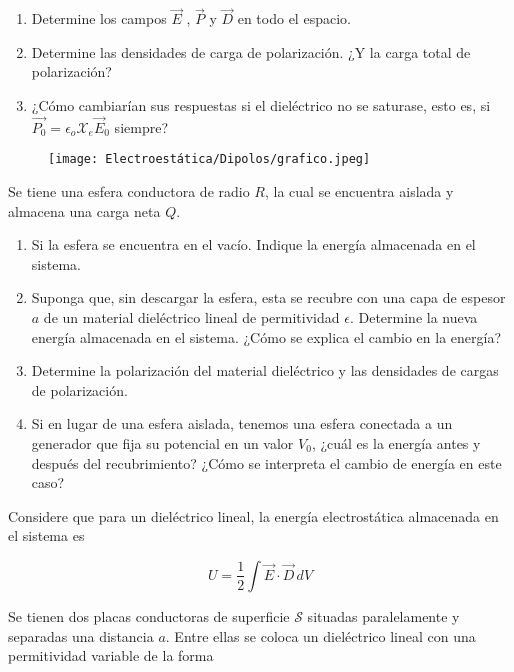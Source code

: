 \begin{enumerate}[label=\alph*)]
    \item Determine los campos $\Vec{E}$ , $\Vec{P}$ y $\Vec{D}$ en todo el espacio.
    \item Determine las densidades de carga de polarización. ¿Y la carga total de polarización?
    \item ¿Cómo cambiarían sus respuestas si el dieléctrico no se saturase, esto es, si $\Vec{P_0}=\epsilon_o\mathcal{X}_e\Vec{E}_0$ siempre?
\end{enumerate}

\begin{figure}[H]
    \centering
    \texttt{[image: Electroestática/Dipolos/grafico.jpeg]}
\end{figure}

\bigbreak
\np %

Se tiene una esfera conductora de radio $R$, la cual se encuentra aislada y almacena una carga neta $Q$.

\begin{enumerate}[label=\alph*)]
    \item Si la esfera se encuentra en el vacío. Indique la energía almacenada en el sistema. %
    \item  Suponga que, sin descargar la esfera, esta se recubre con una capa de espesor $a$ de un material dieléctrico lineal de permitividad $\epsilon$. Determine la nueva energía almacenada en el sistema. ¿Cómo se explica el cambio en la energía?
    \item  Determine la polarización del material dieléctrico y las densidades de cargas de polarización.
    \item Si en lugar de una esfera aislada, tenemos una esfera conectada a un generador que fija su potencial en un valor $V_0$, ¿cuál es la energía antes y después del recubrimiento? ¿Cómo se interpreta el cambio de energía en este caso?
\end{enumerate}

Considere que para un dieléctrico lineal, la energía electrostática almacenada en el sistema es

\[U = \frac{1}{2}\int\Vec{E}\cdot\Vec{D}\,dV\]

\bigbreak

\np

Se tienen dos placas conductoras de superficie $\mathcal{S}$ situadas paralelamente y separadas una distancia $a$. Entre ellas se coloca un dieléctrico lineal con una permitividad variable de la forma

